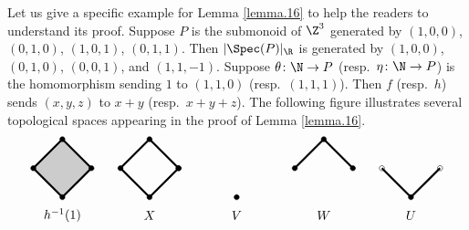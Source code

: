 \documentclass[10pt]{amsart}
\begin{document}
\begin{exm}
Let us give a specific example for Lemma \ref{lemma.16} to help the readers to understand its proof.
Suppose $P$ is the submonoid of $\Z^3$ generated by $(1,0,0)$, $(0,1,0)$, $(1,0,1)$, $(0,1,1)$.
Then $|\Spec(P)|_{\R}$ is generated by $(1,0,0)$, $(0,1,0)$, $(0,0,1)$, and $(1,1,-1)$.
Suppose $\theta\colon \N\to P$ (resp.\ $\eta\colon \N\to P$) is the homomorphism sending $1$ to $(1,1,0)$ (resp.\ $(1,1,1)$).
Then $f$ (resp.\ $h$) sends $(x,y,z)$ to $x+y$ (resp.\ $x+y+z$).
The following figure illustrates several topological spaces appearing in the proof of Lemma \ref{lemma.16}.
\[
\begin{tikzpicture}
\fill[black!20] (0.8,0)--(0,0.8)--(-0.8,0)--(0,-0.8);
\draw[ultra thick] (0.8,0)--(0,0.8)--(-0.8,0)--(0,-0.8)--(0.8,0);
\filldraw (0.8,0) circle (2pt);
\filldraw (0,0.8) circle (2pt);
\filldraw (-0.8,0) circle (2pt);
\filldraw (0,-0.8) circle (2pt);
\node at (0,-1.3) {$h^{-1}(1)$};
\draw[ultra thick] (3.2,0)--(2.4,0.8)--(1.6,0)--(2.4,-0.8)--(3.2,0);
\filldraw (3.2,0) circle (2pt);
\filldraw (2.4,0.8) circle (2pt);
\filldraw (1.6,0) circle (2pt);
\filldraw (2.4,-0.8) circle (2pt);
\filldraw (3.2,0) circle (2pt);
\node at (2.4,-1.3) {$X$};
\filldraw (4.8,-0.8) circle (2pt);
\node at (4.8,-1.3) {$V$};
\draw[ultra thick] (8,0)--(7.2,0.8)--(6.4,0);
\filldraw (8,0) circle (2pt);
\filldraw (7.2,0.8) circle (2pt);
\filldraw (6.4,0) circle (2pt);
\node at (7.2,-1.3) {$W$};
\draw[ultra thick] (10.4,0)--(9.6,-0.8)--(8.8,0);
\draw (10.4,0) circle (2pt);
\filldraw (9.6,-0.8) circle (2pt);
\draw (8.8,0) circle (2pt);
\node at (9.6,-1.3) {$U$};
\end{tikzpicture}
\]

\end{exm}
\end{document}
